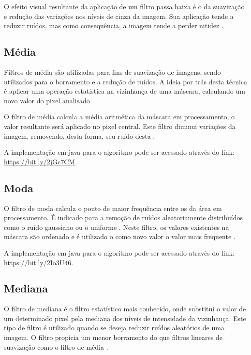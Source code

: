 \documentclass[
	12pt,				%
	oneside,			%
	a4paper,			%
	english,			%
	french,				%
	spanish,			%
	brazil,				%
	]{abntex2}
\begin{document}
O efeito visual resultante da aplicação de um filtro passa baixa é o da suavização e redução das variações nos níveis de cinza da imagem. Sua aplicação tende a reduzir ruídos, mas como consequência, a imagem tende a perder nitidez \cite{conciAzevedoLeta:2008}.

\subsection{Média}
Filtros de média são utilizadas para fins de suavização de imagens, sendo utilizados para o borramento e a redução de ruídos. A ideia por trás desta técnica é aplicar uma operação estatística na vizinhança de uma máscara, calculando um novo valor do pixel analisado \cite{gonzalesWoods:2008}. 

O filtro de média calcula a média aritmética da máscara em processamento, o valor resultante será aplicado no pixel central. Este filtro diminui variações da imagem, removendo, desta forma, seu ruído desta \cite{gonzalesWoods:2008}.

A implementação em java para o algoritmo pode ser acessado através do link: \url{https://bit.ly/2jGc7CM}. 

\subsection{Moda}
O filtro de moda calcula o ponto de maior frequência entre os da área em processamento. É indicado para a remoção de ruídos aleatoriamente distribuídos como o ruído gaussiano ou o uniforme \cite{gonzalesWoods:2008}. Neste filtro, os valores existentes na máscara são ordenado e é utilizado o como novo valor o valor mais frequente \cite{conciAzevedoLeta:2008}.

A implementação em java para o algoritmo pode ser acessado através do link: \url{https://bit.ly/2Io3U46}.

\subsection{Mediana}

O filtro de mediana é o filtro estatístico mais conhecido, onde substitui o valor de um determinado pixel pela mediana dos níveis de intensidade da vizinhança. Este tipo de filtro é utilizado quando se deseja reduzir ruídos aleatórios de uma imagem. O filtro propicia um menor borramento do que filtros lineares de suavização como o filtro de média \cite{gonzalesWoods:2008}.
\end{document}

